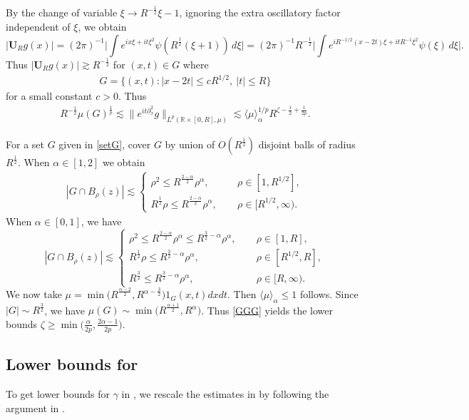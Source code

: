 \documentclass[11pt]{amsart}
\theoremstyle{definition}
\theoremstyle{remark}
\newcommand{\R}{\mathbb{R}}
\newcommand{\inn}[1]{\langle  #1 \rangle}
\begin{document}
By the change of variable $\xi\rightarrow R^{-\frac12}\xi-1$, ignoring the extra oscillatory factor independent of $\xi$, we obtain
\[
\big|\mathbf U_Rg(x)\big|=(2\pi)^{-1}\Big|\int e^{ix\xi+it\xi^2}\psi(R^{\frac12}(\xi+1))\,d\xi\Big|
=(2\pi)^{-1} R^{-\frac12}\Big|\int e^{iR^{-1/2}(x-2t)\xi+itR^{-1}\xi^2} \psi(\xi)\,d\xi\Big|.
\]
Thus $|\mathbf U_Rg(x)|\gtrsim R^{-\frac12}$ for $(x,t)\in G$ where 
\begin{align}\label{setG}
G=\{(x,t): |x-2t|\le cR^{1/2}, ~ |t|\le R\}	
\end{align}
for a small constant $c>0$. Thus
\begin{align}\label{GGG}
R^{-\frac12}\mu(G)^{\frac1p}\lesssim
\big\|e^{it\partial_x^2}g\big\|_{L^p(\R\times [0,R],\mu)}
\lesssim \inn{\mu}_\alpha^{1/p} R^{\zeta-\frac12+\frac1{2p}}.
\end{align}

For a set $G$ given in \eqref{setG}, cover $G$ by union of $O(R^{\frac12})$ disjoint balls of radius $R^{\frac12}$. When $\alpha\in[1,2]$ we obtain
\begin{align*}
|G\cap B_\rho(z)|
\lesssim \begin{cases}
\rho^2 \le R^{\frac{2-\alpha}2}\rho^\alpha, \quad~ & \rho \in [1,R^{1/2}],\\[.8ex]
R^{\frac12}\rho \le R^{\frac{2-\alpha}2}\rho^\alpha, \quad~ & \rho \in [R^{1/2},\infty).
\end{cases}
\end{align*}
When $\alpha \in [0,1]$, we have
\[
|G\cap B_\rho(z)|
\lesssim
\begin{cases}
\rho^2 \le R^{\frac{2-\alpha}2}\rho^\alpha \le R^{\frac32-\alpha}\rho^\alpha, \quad~ & \rho \in [1,R],\\[.8ex]
R^{\frac12}\rho \le R^{\frac32-\alpha}\rho^{\alpha}, \quad~ & \rho \in [R^{1/2},R],\\[.8ex]
R^{\frac32} \le R^{\frac32-\alpha}\rho^{\alpha}, \quad~ & \rho \in [R,\infty).
\end{cases}
\]
We now take $\mu=\min\big(R^{\frac{\alpha-2}2},R^{\alpha-\frac32}\big)1_G(x,t)dxdt$. Then $\inn{\mu}_\alpha\le1$ follows.
Since $|G|\sim R^{\frac32}$, we have $\mu(G)\sim \min\big(R^{\frac{\alpha+1}2},R^{\alpha}\big)$.
Thus \eqref{GGG} yields the lower bounds $\zeta \ge \min\big(\frac{\alpha}{2p}, \frac{2\alpha-1}{2p}\big)$.




\subsection{Lower bounds for }
To get lower bounds for $\gamma$ in , we rescale the estimates in  by following the argument in .
\end{document}
